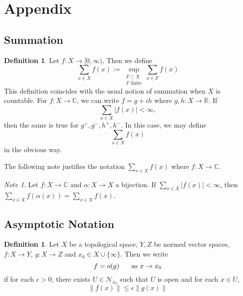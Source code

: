 \documentclass[12pt]{amsart}
\theoremstyle{definition}
\newtheorem{defn}[definition]{Definition}
\theoremstyle{remark}
\newtheorem{note}[remark]{Note}
\theoremstyle{definition}
\newcommand{\al}{\alpha}
\newcommand{\ep}{\epsilon}
\newcommand{\C}{\mathbb{C}}
\newcommand{\R}{\mathbb{R}}
\newcommand{\MN}{\mathcal{N}}
\newcommand{\Rg}{[0,\infty)}
\begin{document}
	\newpage
	
	
	
	
	
	
	
	
	
	
	
	
	
	
	\section{Appendix}
	
	\subsection{Summation}
	
	\begin{defn}
		Let $f:X \rightarrow \Rg$, Then we define $$\sum_{x \in X} f(x) := \sup_{\substack{F \subset X \\ F \text{ finite}}} \sum_{x \in F} f(x)$$ This definition coincides with the usual notion of summation when $X$ is countable. For $f:X \rightarrow \C$, we can write $f = g +ih$ where $g,h:X \rightarrow \R$. If $$\sum_{x \in X}|f(x)| < \infty,$$ then the same is true for $g^+,g^-,h^+,h^-$. In this case, we may define $$\sum_{x \in X} f(x)$$ in the obvious way.
	\end{defn} 
	
	The following note justifies the notation $\sum_{x \in X}f(x)$ where $f:X \rightarrow \C$.
	
	\begin{note}
		Let $f:X \rightarrow \C$ and $\al:X \rightarrow X$ a bijection. If $\sum_{x \in X}|f(x)|< \infty$, then $\sum_{x \in X}f( \al (x)) = \sum_{x \in X}f(x) $.
	\end{note}
	
	\newpage	
	
	\subsection{Asymptotic Notation}
	
	\begin{defn}
	Let $X$ be a topological space, $Y, Z$ be normed vector spaces, $f:X \rightarrow Y$, $g: X \rightarrow Z$ and $x_0 \in X \cup \{\infty\}$. Then we write $$f = o(g) \hspace{.5cm} \text{ as } x \rightarrow x_0$$ if for each $\ep >0$, there exists $U \in \MN_{x_0}$ such that $U$ is open and for each $x \in U$, $$\|f(x)\| \leq \ep\|g(x)\|$$
	\end{defn}
	
\end{document}
